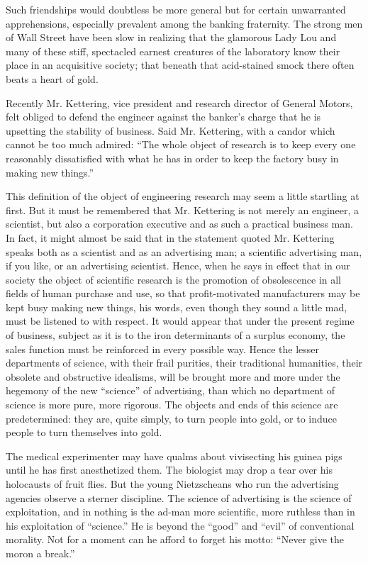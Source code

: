 \documentclass[nohyper,openany,nobib]{tufte-book}
\begin{document}
Such friendships would doubtless be more general but for certain
unwarranted apprehensions, especially prevalent among the banking
fraternity. The strong men of Wall Street have been slow in realizing
that the glamorous Lady Lou and many of these stiff, spectacled earnest
creatures of the laboratory know their place in an acquisitive society;
that beneath that acid-stained smock there often beats a heart of gold.

Recently Mr. Kettering, vice president and research director of General
Motors, felt obliged to defend the engineer against the banker's charge
that he is upsetting the stability of business. Said Mr. Kettering, with
a candor which cannot be too much admired: ``The whole object of
research is to keep every one reasonably dissatisfied with what he has
in order to keep the factory busy in making new things.''

This definition of the object of engineering research may seem a little
startling at first. But it must be remembered that Mr. Kettering is not
merely an engineer, a scientist, but also a corporation executive and as
such a practical business man. In fact, it might almost be said that in
the statement quoted Mr. Kettering speaks both as a scientist and as an
advertising man; a scientific advertising man, if you like, or an
advertising scientist. Hence, when he says in effect that in our society
the object of scientific research is the promotion of obsolescence in
all fields of human purchase and use, so that profit-motivated
manufacturers may be kept busy making new things, his words, even though
they sound a little mad, must be listened to with respect. It would
appear that under the present regime of business, subject as it is to
the iron determinants of a surplus economy, the sales function must be
reinforced in every possible way. Hence the lesser departments of
science, with their frail purities, their traditional humanities, their
obsolete and obstructive idealisms, will be brought more and more under
the hegemony of the new ``science'' of advertising, than which no
department of science is more pure, more rigorous. The objects and ends
of this science are predetermined: they are, quite simply, to turn
people into gold, or to induce people to turn themselves into gold.

The medical experimenter may have qualms about vivisecting his guinea
pigs until he has first anesthetized them. The biologist may drop a tear
over his holocausts of fruit flies. But the young Nietzscheans who run
the advertising agencies observe a sterner discipline. The science of
advertising is the science of exploitation, and in nothing is the ad-man
more scientific, more ruthless than in his exploitation of ``science.''
He is beyond the ``good'' and ``evil'' of conventional morality. Not for
a moment can he afford to forget his motto: ``Never give the moron a
break.''
\end{document}
